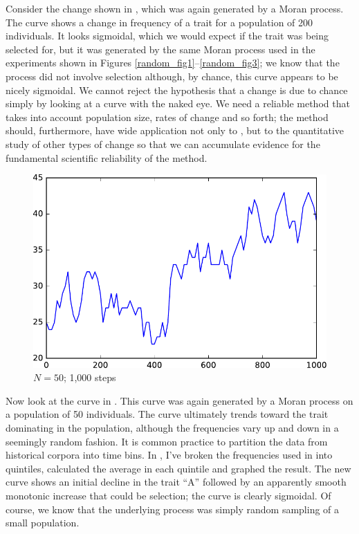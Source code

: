 \documentclass[output=paper]{langsci/langscibook}
\begin{document}
Consider the change shown in , which was again
generated by a Moran process.  The curve shows a change in frequency
of a trait for a population of 200 individuals. It looks sigmoidal,
which we would expect if the trait was being selected for, but it was
generated by the same Moran process used in the experiments shown in
Figures \ref{random_fig1}--\ref{random_fig3}; we know that the process
did not involve selection although, by chance, this curve appears to
be nicely sigmoidal.  We cannot reject the hypothesis that a change is
due to chance simply by looking at a curve with the naked eye.  We
need a reliable method that takes into account population size, rates
of change and so forth; the method should, furthermore, have wide
application not only to , but to the quantitative study
of other types of change so that we can accumulate evidence for the
fundamental scientific reliability of the method.

\begin{figure}
  \includegraphics[width=.75\linewidth]{img/jaggedy.pdf}
  \caption{$N = 50$; 1,000 steps\label{jaggedy}}
\end{figure}

Now look at the curve in .  This curve was again
generated by a Moran process on a population of 50 individuals.  The
curve ultimately trends toward the trait dominating in the population,
although the frequencies vary up and down in a seemingly random
fashion.  It is common practice to partition the data from historical
corpora into time bins.  In , I've broken the
frequencies used in  into quintiles, calculated
the average in each quintile and graphed the result.  The new curve
shows an initial decline in the trait ``A'' followed by an apparently
smooth monotonic increase that could be selection; the curve is
clearly sigmoidal.  Of course, we know that the underlying process was
simply random sampling of a small population.
\end{document}

